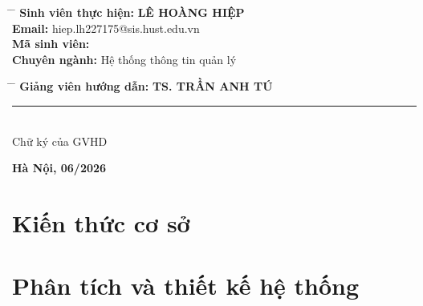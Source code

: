 \documentclass[12pt,a4paper]{report}
\theoremstyle{definition}
\theoremstyle{remark}
\begin{document}
\begin{titlepage}
\begin{tcolorbox}[colframe=black, colback=white, width=17cm, height=24.5cm, center, sharp corners, boxrule=1.2mm, borderline={0.6mm}{0mm}{black}]
\begin{center}
                \begin{tabbing}
                    \hspace{5cm} \= \hspace{7cm} \= \kill
                    \textbf{Sinh viên thực hiện:} \> \textbf{LÊ HOÀNG HIỆP} \\
                    \textbf{Email:} \> hiep.lh227175@sis.hust.edu.vn \\
                    \textbf{Mã sinh viên:}  \\
                    \textbf{Chuyên ngành:} \> Hệ thống thông tin quản lý \\
                \end{tabbing}
                \vspace{10mm}
            \begin{tabbing}
    \hspace{5cm} \= \hspace{7cm} \= \kill
    \textbf{Giảng viên hướng dẫn:} \> \textbf{TS. TRẦN ANH TÚ} \> \rule{3.5cm}{0.4pt} \\
     \> \> Chữ ký của GVHD
            \end{tabbing}
                
                \vfill
                \vspace{3cm}
                \textbf{Hà Nội, 06/2026}
            \end{center}
    \end{tcolorbox}

\end{titlepage}





\tableofcontents

\clearpage
{}
\listoffigures

\clearpage
{}
\listoftables




\thispagestyle{fancy}


\chapter{Kiến thức cơ sở}


\newpage
\chapter{Phân tích và thiết kế hệ thống}
\end{document}
